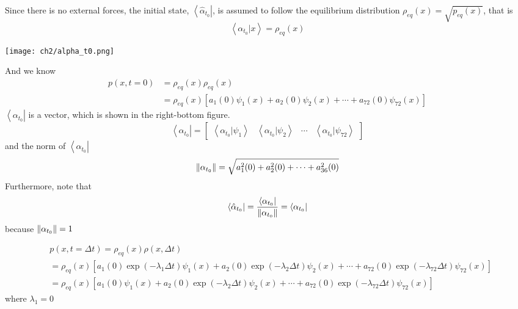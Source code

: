 \begin{definition}
Since there is no external forces, the initial state, $\left< \hat{\alpha}_{t_0} \right|$, is assumed to follow the equilibrium distribution $\rho_{eq}(x)=\sqrt{p_{eq}(x)}$, that is
\begin{equation}
        \left< \alpha_{t_0} | x \right> = \rho_{eq}(x)
\end{equation}
\begin{center}
        \texttt{[image: ch2/alpha\_t0.png]}   
\end{center}
And we know
\begin{align*}
        p(x,t=0) &= \rho_{eq}(x) \rho_{eq}(x)\\
        &= \rho_{eq}(x)[a_{1}(0) \psi_1(x)+a_{2}(0)\psi_2(x)+\cdots+a_{72}(0)\psi_{72}(x)]       
\end{align*}
$\left< \alpha_{t_0} \right|$ is a vector, which is shown in the right-bottom figure.
\begin{equation}
        \left< \alpha_{t_0} \right| = \begin{bmatrix}\left< \alpha_{t_0} | \psi_1 \right> & \left< \alpha_{t_0} | \psi_2 \right> & \cdots & \left< \alpha_{t_0} | \psi_{72} \right> \end{bmatrix}
\end{equation}
and the norm of $\left< \alpha_{t_0} \right|$
\begin{equation}
        \left\lVert\alpha_{t_0}\right\rVert = \sqrt{a_{1}^2(0) + a_{2}^2(0) + \cdots + a_{36}^2(0)}       
\end{equation}
Furthermore, note that
\begin{equation}
        \left< \hat{\alpha}_{t_0} \right| = \frac{\left< \alpha_{t_{0}} \right|}{\left\lVert\alpha_{t_{0}}\right\rVert} = \left< \alpha_{t_{0}} \right|
\end{equation}
because $\left\lVert\alpha_{t_0}\right\rVert = 1$
\end{definition}

\begin{definition}[$\rho(x, t=\Delta t) = \left<\alpha_{t_0}| e^{-\textbf{H}\Delta t}|x \right>$]
\begin{align*}
        &p(x,t=\Delta t) = \rho_{eq}(x) \rho(x, \Delta t)\\
        &= \rho_{eq}(x)[a_{1}(0) \exp{(-\lambda_{1}\Delta t)}\psi_1(x)+a_{2}(0)\exp{(-\lambda_{2}\Delta t)}\psi_2(x)+\cdots+a_{72}(0)\exp{(-\lambda_{72}\Delta t)}\psi_{72}(x)]  \\
        &=  \rho_{eq}(x)[a_{1}(0)\psi_1(x)+a_{2}(0)\exp{(-\lambda_{2}\Delta t)}\psi_2(x)+\cdots+a_{72}(0)\exp{(-\lambda_{72}\Delta t)}\psi_{72}(x)]  
\end{align*}
where $\lambda_1 = 0$
\end{definition}

